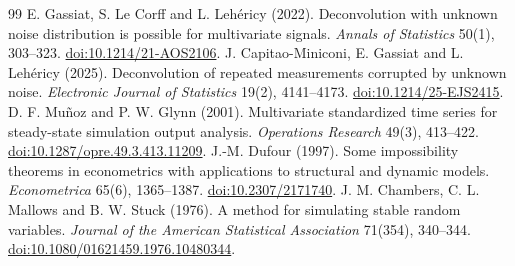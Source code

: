 \documentclass[11pt,a4paper]{article}
\theoremstyle{remark}\newtheorem{remark}[theorem]{Remark}
\begin{document}
\begin{thebibliography}{99}
 E. Gassiat, S. Le Corff and L. Leh\'ericy (2022). Deconvolution with unknown noise distribution is possible for multivariate signals. \emph{Annals of Statistics} 50(1), 303--323. \href{https://doi.org/10.1214/21-AOS2106}{doi:10.1214/21-AOS2106}.
 J. Capitao-Miniconi, E. Gassiat and L. Leh\'ericy (2025). Deconvolution of repeated measurements corrupted by unknown noise. \emph{Electronic Journal of Statistics} 19(2), 4141--4173. \href{https://doi.org/10.1214/25-EJS2415}{doi:10.1214/25-EJS2415}.
 D. F. Mu\~noz and P. W. Glynn (2001). Multivariate standardized time series for steady-state simulation output analysis. \emph{Operations Research} 49(3), 413--422. \href{https://doi.org/10.1287/opre.49.3.413.11209}{doi:10.1287/opre.49.3.413.11209}.
 J.-M. Dufour (1997). Some impossibility theorems in econometrics with applications to structural and dynamic models. \emph{Econometrica} 65(6), 1365--1387. \href{https://doi.org/10.2307/2171740}{doi:10.2307/2171740}.
 J. M. Chambers, C. L. Mallows and B. W. Stuck (1976). A method for simulating stable random variables. \emph{Journal of the American Statistical Association} 71(354), 340--344. \href{https://doi.org/10.1080/01621459.1976.10480344}{doi:10.1080/01621459.1976.10480344}.

\end{thebibliography}
\end{document}
